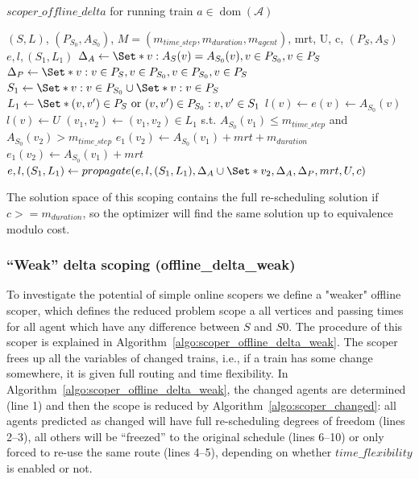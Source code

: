 \documentclass{article}
\DeclareMathOperator{\dom}{dom}
\begin{document}
\begin{algorithm}
	\caption{$scoper\_offline\_delta$ for running train $a \in \dom(\mathcal{A})$} \label{algo:scoper_offline_delta}
	\begin{algorithmic}[1]
		\Require $(S,L)$, $(P_{S_0},A_{S_0})$, $M=(m_{time\_step},m_{duration},m_{agent})$, mrt, U, c, $(P_S,A_S)$
	    \Ensure $e,l,(S_1,L_1)$
	    \State $\Delta_A \leftarrow \Set*{v: A_S(v)=A_{S_0}(v), v\in P_{S_0}, v \in P_S}$
	    \State $\Delta_P \leftarrow \Set*{v: v\in P_S, v\in P_{S_0}, v\in P_{S_0}, v \in P_S}$
	    \State $S_1 \leftarrow \Set*{v: v\in P_{S_0}} \cup \Set*{v: v\in P_{S}}$
	    \State $L_1 \leftarrow \Set*{(v,v^\prime) \in P_S \textrm{ or } (v,v^\prime) \in P_{S_0}: v,v^\prime \in S_1}$
	        \State $l(v)\leftarrow e(v)\leftarrow A_{S_0}(v)$
	    \EndFor
	        \State $l(v) \leftarrow U$
	    \EndFor
	    \State $(v_1,v_2) \leftarrow (v_1,v_2) \in L_1$ s.t. $A_{S_0}(v_1)\leq m_{time\_step}$ and $A_{S_0}(v_2)>m_{time\_step}$
            \State $e_1(v_2) \leftarrow A_{S_0}(v_1)+mrt+m_{duration}$
        \Else
            \State $e_1(v_2) \leftarrow A_{S_0}(v_1)+mrt$
        \EndIf
        \EndIf
	    \State $e,l,(S_1,L_1) \leftarrow propagate(e,l,(S_1,L_1),\Delta_A \cup \Set*{v_2}, \Delta_A, \Delta_P, mrt, U, c)$
	\end{algorithmic}
\end{algorithm}
The solution space of this scoping contains the full re-scheduling solution if $c >= m_{duration}$, so the optimizer will find the same solution up to equivalence modulo cost.



\subsubsection{``Weak'' delta scoping (offline\_delta\_weak)}\label{subsubsec:offline_delta_weak}


To investigate the potential of simple online scopers we define a "weaker" offline scoper, which defines the reduced problem scope a all vertices and passing times for all agent which have any difference between $S$ and $S0$.
The procedure of this scoper is explained in Algorithm~\ref{algo:scoper_offline_delta_weak}. The scoper frees up all the variables of changed trains, i.e., if a train has some change somewhere, it is given full routing and time flexibility. In Algorithm~\ref{algo:scoper_offline_delta_weak}, the changed agents are determined (line 1) and then the scope is reduced by Algorithm~\ref{algo:scoper_changed}:
all agents predicted as changed will have full re-scheduling degrees of freedom (lines 2--3), all others will be ``freezed'' to the original schedule (lines 6--10) or only forced to re-use the same route (lines 4--5), depending on whether $time\_flexibility$ is enabled or not.
\end{document}
